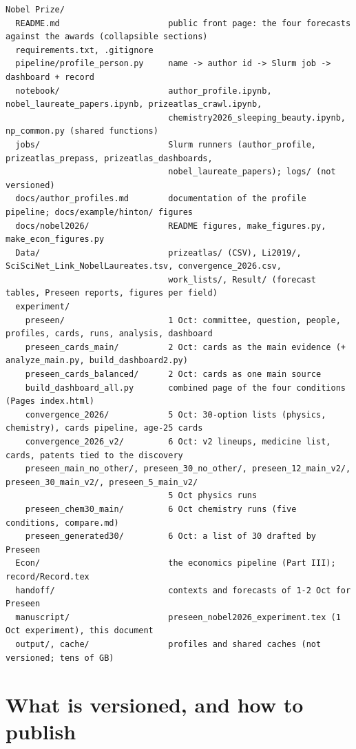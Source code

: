 \documentclass[11pt,a4paper]{article}
\begin{document}
\begin{Verbatim}
Nobel Prize/
  README.md                      public front page: the four forecasts against the awards (collapsible sections)
  requirements.txt, .gitignore
  pipeline/profile_person.py     name -> author id -> Slurm job -> dashboard + record
  notebook/                      author_profile.ipynb, nobel_laureate_papers.ipynb, prizeatlas_crawl.ipynb,
                                 chemistry2026_sleeping_beauty.ipynb, np_common.py (shared functions)
  jobs/                          Slurm runners (author_profile, prizeatlas_prepass, prizeatlas_dashboards,
                                 nobel_laureate_papers); logs/ (not versioned)
  docs/author_profiles.md        documentation of the profile pipeline; docs/example/hinton/ figures
  docs/nobel2026/                README figures, make_figures.py, make_econ_figures.py
  Data/                          prizeatlas/ (CSV), Li2019/, SciSciNet_Link_NobelLaureates.tsv, convergence_2026.csv,
                                 work_lists/, Result/ (forecast tables, Preseen reports, figures per field)
  experiment/
    preseen/                     1 Oct: committee, question, people, profiles, cards, runs, analysis, dashboard
    preseen_cards_main/          2 Oct: cards as the main evidence (+ analyze_main.py, build_dashboard2.py)
    preseen_cards_balanced/      2 Oct: cards as one main source
    build_dashboard_all.py       combined page of the four conditions (Pages index.html)
    convergence_2026/            5 Oct: 30-option lists (physics, chemistry), cards pipeline, age-25 cards
    convergence_2026_v2/         6 Oct: v2 lineups, medicine list, cards, patents tied to the discovery
    preseen_main_no_other/, preseen_30_no_other/, preseen_12_main_v2/, preseen_30_main_v2/, preseen_5_main_v2/
                                 5 Oct physics runs
    preseen_chem30_main/         6 Oct chemistry runs (five conditions, compare.md)
    preseen_generated30/         6 Oct: a list of 30 drafted by Preseen
  Econ/                          the economics pipeline (Part III); record/Record.tex
  handoff/                       contexts and forecasts of 1-2 Oct for Preseen
  manuscript/                    preseen_nobel2026_experiment.tex (1 Oct experiment), this document
  output/, cache/                profiles and shared caches (not versioned; tens of GB)
\end{Verbatim}

\section{What is versioned, and how to publish}\label{sec:versioned}
\end{document}
